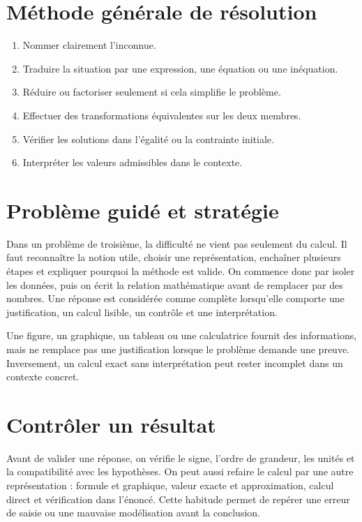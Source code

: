 \section{Méthode générale de résolution}
\begin{methode}
\begin{enumerate}
\item Nommer clairement l’inconnue.
\item Traduire la situation par une expression, une équation ou une inéquation.
\item Réduire ou factoriser seulement si cela simplifie le problème.
\item Effectuer des transformations équivalentes sur les deux membres.
\item Vérifier les solutions dans l’égalité ou la contrainte initiale.
\item Interpréter les valeurs admissibles dans le contexte.
\end{enumerate}
\end{methode}

\section{Problème guidé et stratégie}
Dans un problème de troisième, la difficulté ne vient pas seulement du calcul. Il faut reconnaître la notion utile, choisir une représentation, enchaîner plusieurs étapes et expliquer pourquoi la méthode est valide. On commence donc par isoler les données, puis on écrit la relation mathématique avant de remplacer par des nombres. Une réponse est considérée comme complète lorsqu’elle comporte une justification, un calcul lisible, un contrôle et une interprétation.

\begin{attention}
Une figure, un graphique, un tableau ou une calculatrice fournit des informations, mais ne remplace pas une justification lorsque le problème demande une preuve. Inversement, un calcul exact sans interprétation peut rester incomplet dans un contexte concret.
\end{attention}

\section{Contrôler un résultat}
Avant de valider une réponse, on vérifie le signe, l’ordre de grandeur, les unités et la compatibilité avec les hypothèses. On peut aussi refaire le calcul par une autre représentation : formule et graphique, valeur exacte et approximation, calcul direct et vérification dans l’énoncé. Cette habitude permet de repérer une erreur de saisie ou une mauvaise modélisation avant la conclusion.

